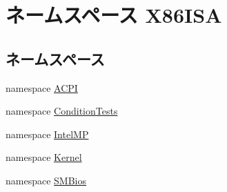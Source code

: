 \hypertarget{namespaceX86ISA}{
\section{ネームスペース X86ISA}
\label{namespaceX86ISA}
}
\subsection*{ネームスペース}
\begin{DoxyCompactItemize}
\item 
namespace \hyperlink{namespaceX86ISA_1_1ACPI}{ACPI}
\item 
namespace \hyperlink{namespaceX86ISA_1_1ConditionTests}{ConditionTests}
\item 
namespace \hyperlink{namespaceX86ISA_1_1IntelMP}{IntelMP}
\item 
namespace \hyperlink{namespaceX86ISA_1_1Kernel}{Kernel}
\item 
namespace \hyperlink{namespaceX86ISA_1_1SMBios}{SMBios}
\end{DoxyCompactItemize}
